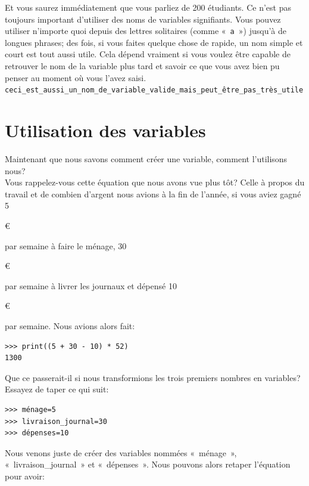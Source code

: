 Et vous saurez immédiatement que vous parliez de 200 étudiants. Ce n'est pas toujours important d'utiliser des noms de variables signifiants. Vous pouvez utiliser n'importe quoi depuis des lettres solitaires (comme «~\texttt{a}~») jusqu'à de longues phrases; des fois, si vous faites quelque chose de rapide, un nom simple et court est tout aussi utile. Cela dépend vraiment si vous voulez être capable de retrouver le nom de la variable plus tard et savoir ce que vous avez bien pu penser au moment où vous l'avez saisi.\\

\texttt{ceci\_est\_aussi\_un\_nom\_de\_variable\_valide\_mais\_peut\_être\_pas\_très\_utile}\\

\section{Utilisation des variables}

Maintenant que nous savons comment créer une variable, comment l'utilisons nous?\\ Vous rappelez-vous cette équation que nous avons vue plus tôt? Celle à propos du travail et de combien d'argent nous avions à la fin de l'année, si vous aviez gagné 5\begin{small}\euro\end{small} par semaine à faire le ménage, 30\begin{small}\euro\end{small} par semaine à livrer les journaux et dépensé 10\begin{small}\euro\end{small} par semaine. Nous avions alors fait:

\begin{Verbatim}[frame=single,rulecolor=\color{mbleu}, label=à taper]
>>> print((5 + 30 - 10) * 52)
1300
\end{Verbatim}

Que ce passerait-il si nous transformions les trois premiers nombres en variables? Essayez de taper ce qui suit:

\begin{Verbatim}[frame=single,rulecolor=\color{mbleu}, label=à taper]
>>> ménage=5
>>> livraison_journal=30
>>> dépenses=10
\end{Verbatim}
 

Nous venons juste de créer des variables nommées «~ménage~», «~livraison\_journal~» et «~dépenses~». Nous pouvons alors retaper l'équation pour avoir: \\


